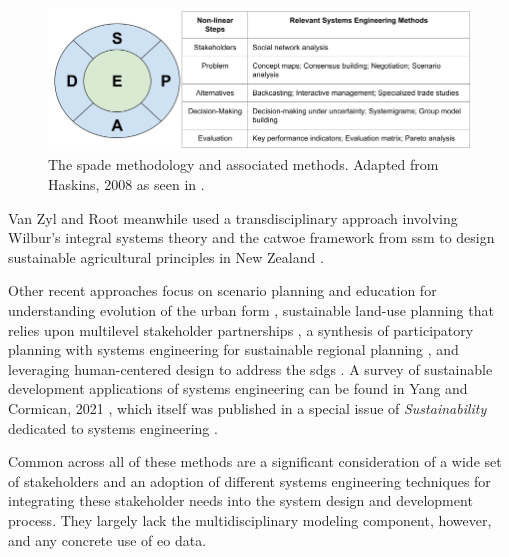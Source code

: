 \begin{figure}[!htb]
\centering
\includegraphics[scale=0.4]{Figures/chap3/spade.png}
\caption[The SPADE Methodology and associated methods]{The \ac{spade} methodology and associated methods. Adapted from Haskins, 2008 \cite{haskinsSystemsEngineeringAnalyzed2008} as seen in \cite{reidSystemsEngineeringAppliedPendingPublication}.}
\label{fig:spade}
\end{figure}

Van Zyl and Root meanwhile used a transdisciplinary approach involving Wilbur's integral systems theory \cite{esbjorn-hargensOverviewIntegralTheory2010} and the \ac{catwoe} framework from \ac{ssm} \cite{checklandSoftSystemsMethodology2000} to design sustainable agricultural principles in New Zealand \cite{vanzylTransdisciplinaryDesignImplementation2020}.

Other recent approaches focus on scenario planning and education for understanding evolution of the urban form \cite{geyerSystemsEngineeringMethodology2014}, sustainable land-use planning that relies upon multilevel stakeholder partnerships \cite{puchol-salortUrbanPlanningSustainability2021}, a synthesis of participatory planning with systems engineering for sustainable regional planning \cite{aspenDevelopingParticipatoryPlanning2021}, and leveraging human-centered design to address the \acp{sdg} \cite{muellerUsingHumanCenteredDesign2020}. A survey of sustainable development applications of systems engineering can be found in Yang and Cormican, 2021 \cite{yangCrossoversConnectivitySystems2021}, which itself was published in a special issue of \textit{Sustainability} dedicated to systems engineering \cite{haskinsSystemsEngineeringSustainable2021}.

Common across all of these methods are a significant consideration of a wide set of stakeholders and an adoption of different systems engineering techniques for integrating these stakeholder needs into the system design and development process. They largely lack the multidisciplinary modeling component, however, and any concrete use of \ac{eo} data.

